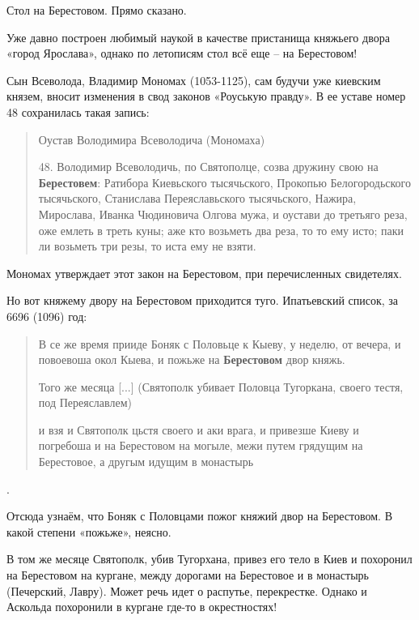 \documentclass[a5paper,11pt,openany]{article}
\begin{document}
Стол на Берестовом. Прямо сказано.

Уже давно построен любимый наукой в качестве пристанища княжьего двора «город Ярослава», однако по летописям стол всё еще – на Берестовом!

Сын Всеволода, Владимир Мономах (1053-1125), сам будучи уже киевским князем, вносит изменения в свод законов «Роуськую правду». В ее уставе номер 48 сохранилась такая запись:

\begin{quotation}
\noindent Оустав Володимира Всеволодича (Мономаха)

48. Володимир Всеволодичь, по Святополце, созва дружину свою на \textbf{Берестовем}: Ратибора Киевьского тысячьского, Прокопью Белогородьского тысячьского, Станислава Переяславьского тысячьского, Нажира, Мирослава, Иванка Чюдиновича Олгова мужа, и оустави до третьяго реза, оже емлеть в треть куны; аже кто возьметь два реза, то то ему исто; паки ли возьметь три резы, то иста ему не взяти.
\end{quotation}

Мономах утверждает этот закон на Берестовом, при перечисленных свидетелях.


Но вот княжему двору на Берестовом приходится туго. Ипатьевский список, за 6696 (1096) год:

\begin{quotation}
\noindent В се же время прииде Боняк с Половьце к Кыеву, у неделю, от вечера, и повоевоша окол Кыева, и пожьже на \textbf{Берестовом} двор княжь.

Того же месяца [...] (Святополк убивает Половца Тугоркана, своего тестя, под Переяславлем)

и взя и Святополк цьстя своего и аки врага, и привезше Киеву и погребоша и на Берестовом на могыле, межи путем грядущим на Берестовое, а другым идущим в монастырь
\end{quotation}.

Отсюда узнаём, что Боняк с Половцами пожог княжий двор на Берестовом. В какой степени «пожьже», неясно. 

В том же месяце Святополк, убив Тугорхана, привез его тело в Киев и похоронил на Берестовом на кургане, между дорогами на Берестовое и в монастырь (Печерский, Лавру). Может речь идет о распутье, перекрестке. Однако и Аскольда похоронили в кургане где-то в окрестностях!
\end{document}
